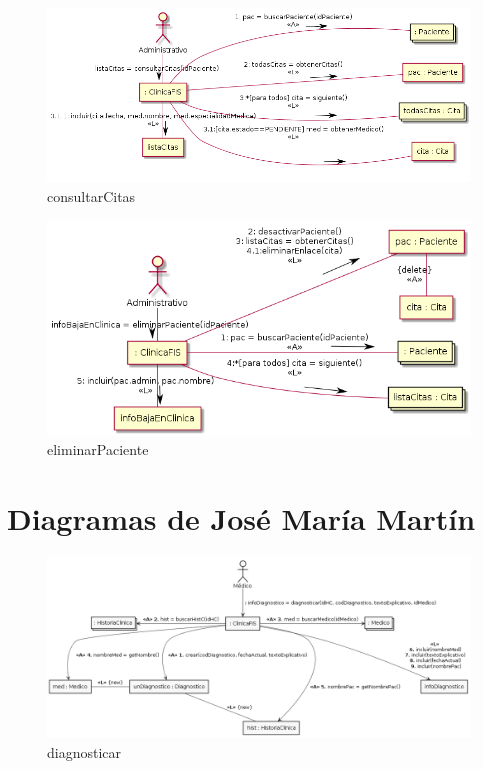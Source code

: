 \documentclass[11pt,a4paper]{article}
\begin{document}
\begin{figure}[H]
	\caption{consultarCitas}
	\centering
	\includegraphics[width=\textwidth,height=\textheight,keepaspectratio]{Diagramas/consultarCitas}
\end{figure}

\begin{figure}[H]
	\caption{eliminarPaciente}
	\centering
	\includegraphics[width=\textwidth,height=\textheight,keepaspectratio]{Diagramas/eliminarPaciente}
\end{figure}

\section{Diagramas de José María Martín}

\begin{figure}[H]
	\caption{diagnosticar}
	\centering
	\includegraphics[width=\textwidth,height=\textheight,keepaspectratio]{Diagramas/diagnosticar}
\end{figure}
\end{document}
